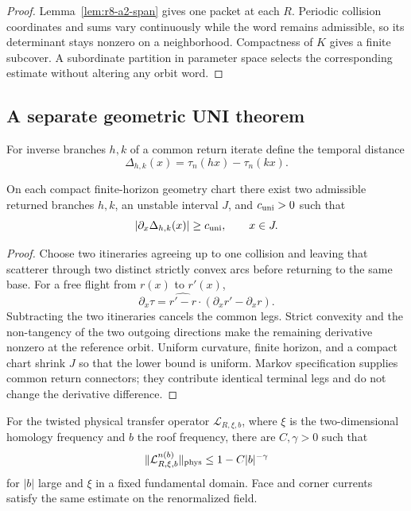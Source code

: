 \begin{proof}
Lemma~\ref{lem:r8-a2-span} gives one packet at each $R$.  Periodic collision
coordinates and sums vary continuously while the word remains admissible, so
its determinant stays nonzero on a neighborhood.  Compactness of $K$ gives a
finite subcover.  A subordinate partition in parameter space selects the
corresponding estimate without altering any orbit word.
\end{proof}

\subsection{A separate geometric UNI theorem}

For inverse branches $h,k$ of a common return iterate define the temporal
distance
\[
 \Delta_{h,k}(x)=\tau_n(hx)-\tau_n(kx).
\]

\begin{lemma}
\label{lem:r8-a2-uni-geometry}
On each compact finite-horizon geometry chart there exist two admissible
returned branches $h,k$, an unstable interval $J$, and $c_{\rm uni}>0$ such
that
\[
 |\partial_x\Delta_{h,k}(x)|\ge c_{\rm uni},\qquad x\in J.
\]
\end{lemma}

\begin{proof}
Choose two itineraries agreeing up to one collision and leaving that scatterer
through two distinct strictly convex arcs before returning to the same base.
For a free flight from $r(x)$ to $r'(x)$,
\[
 \partial_x\tau=\widehat{r'-r}\cdot(\partial_xr'-\partial_xr).
\]
Subtracting the two itineraries cancels the common legs.  Strict convexity and
the non-tangency of the two outgoing directions make the remaining derivative
nonzero at the reference orbit.  Uniform curvature, finite horizon, and a
compact chart shrink $J$ so that the lower bound is uniform.  Markov
specification supplies common return connectors; they contribute identical
terminal legs and do not change the derivative difference.
\end{proof}

\begin{theorem}
\label{thm:r8-a2-dolgopyat}
For the twisted physical transfer operator
$\mathcal L_{R,\xi,b}$, where $\xi$ is the two-dimensional homology frequency
and $b$ the roof frequency, there are $C,\gamma>0$ such that
\[
 \|\mathcal L_{R,\xi,b}^{n(b)}\|_{\rm phys}
 \le 1-C|b|^{-\gamma}
\]
for $|b|$ large and $\xi$ in a fixed fundamental domain.  Face and corner
currents satisfy the same estimate on the renormalized field.
\end{theorem}

